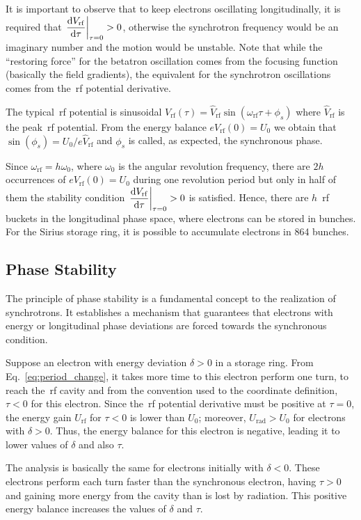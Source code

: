 It is important to observe that to keep electrons oscillating longitudinally, it is required that $\left.\dfrac{\mathrm{d} V_{\mathrm{rf}}}{\mathrm{d} \tau}\right|_{\tau = 0} > 0$, otherwise the synchrotron frequency would be an imaginary number and the motion would be unstable. Note that while the ``restoring force'' for the betatron oscillation comes from the focusing function (basically the field gradients), the equivalent for the synchrotron oscillations comes from the~\gls{rf} potential derivative.

The typical~\gls{rf} potential is sinusoidal $V_{\mathrm{rf}}(\tau) = \hat{V}_{\mathrm{rf}} \sin \left(\omega_{\mathrm{rf}}\tau + \phi_s\right)$ where $\hat{V}_{\mathrm{rf}}$ is the peak~\gls{rf} potential. From the energy balance $eV_{\mathrm{rf}}(0) = U_0$ we obtain that $\sin(\phi_s) = U_0/e\hat{V}_{\mathrm{rf}}$ and $\phi_s$ is called, as expected, the synchronous phase.

Since $\omega_{\mathrm{rf}} = h \omega_0$, where $\omega_0$ is the angular revolution frequency, there are $2h$ occurrences of $eV_{\mathrm{rf}}(0) = U_0$ during one revolution period but only in half of them the stability condition $\left.\dfrac{\mathrm{d} V_{\mathrm{rf}}}{\mathrm{d} \tau}\right|_{\tau = 0} > 0$ is satisfied. Hence, there are $h$~\gls{rf} buckets in the longitudinal phase space, where electrons can be stored in bunches. For the Sirius storage ring, it is possible to accumulate electrons in 864 bunches.
\subsection{Phase Stability}
The principle of phase stability is a fundamental concept to the realization of synchrotrons. It establishes a mechanism that guarantees that electrons with energy or longitudinal phase deviations are forced towards the synchronous condition.

Suppose an electron with energy deviation $\delta > 0$ in a storage ring. From Eq.~\eqref{eq:period_change}, it takes more time to this electron perform one turn, to reach the~\gls{rf} cavity and from the convention used to the coordinate definition, $\tau < 0$ for this electron. Since the~\gls{rf} potential derivative must be positive at $\tau = 0$, the energy gain $U_{\mathrm{rf}}$ for $\tau < 0$ is lower than $U_0$; moreover, $U_{\mathrm{rad}} > U_0$ for electrons with $\delta > 0$. Thus, the energy balance for this electron is negative, leading it to lower values of $\delta$ and also $\tau$.

The analysis is basically the same for electrons initially with $\delta < 0$. These electrons perform each turn faster than the synchronous electron, having $\tau > 0$ and gaining more energy from the cavity than is lost by radiation. This positive energy balance increases the values of $\delta$ and $\tau$.

